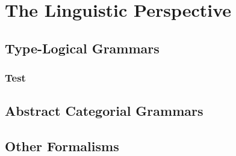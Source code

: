 \section{The Linguistic Perspective}

\subsection{Type-Logical Grammars}

\subsubsection{Test}

\subsection{Abstract Categorial Grammars}

\subsection{Other Formalisms}

\nocite{sorensen2006lectures}
\nocite{martin1982constructive}





